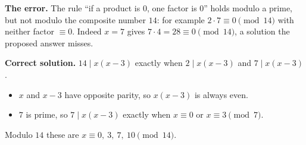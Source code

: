 \textbf{The error.} The rule ``if a product is $0$, one factor is $0$'' holds modulo a prime, but not modulo the composite number $14$: for example $2\cdot7\equiv0\pmod{14}$ with neither factor $\equiv0$. Indeed $x=7$ gives $7\cdot4=28\equiv0\pmod{14}$, a solution the proposed answer misses.

\textbf{Correct solution.} $14\mid x(x-3)$ exactly when $2\mid x(x-3)$ and $7\mid x(x-3)$.
\begin{itemize}
\item $x$ and $x-3$ have opposite parity, so $x(x-3)$ is always even.
\item $7$ is prime, so $7\mid x(x-3)$ exactly when $x\equiv0$ or $x\equiv3\pmod7$.
\end{itemize}
Modulo $14$ these are $\boxed{x\equiv0,\ 3,\ 7,\ 10\pmod{14}}$.

